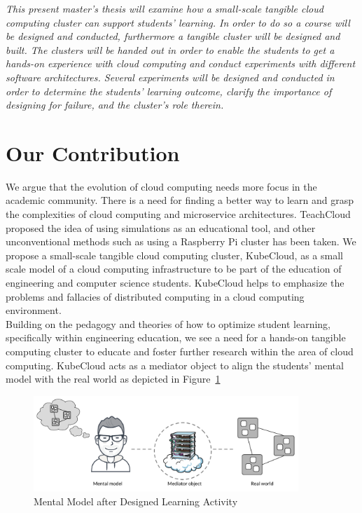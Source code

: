 \noindent\textit{This present master’s thesis will examine how a small-scale tangible cloud computing cluster can support students’ learning. In order to do so a course will be designed and conducted, furthermore a tangible cluster will be designed and built. The clusters will be handed out in order to enable the students to get a hands-on experience with cloud computing and conduct experiments with different software architectures. Several experiments will be designed and conducted in order to determine the students’ learning outcome, clarify the importance of designing for failure, and the cluster’s role therein.}

\section{Our Contribution}


We argue that the evolution of cloud computing needs more focus in the academic community. There is a need for finding a better way to learn and grasp the complexities of cloud computing and microservice architectures. TeachCloud proposed the idea of using simulations as an educational tool, and other unconventional methods such as using a Raspberry Pi cluster has been taken. We propose a small-scale tangible cloud computing cluster, KubeCloud, as a small scale model of a cloud computing infrastructure to be part of the education of engineering and computer science students. KubeCloud helps to emphasize the problems and fallacies of distributed computing in a cloud computing environment. \\

\noindent Building on the pedagogy and theories of how to optimize student learning, specifically within engineering education, we see a need for a hands-on tangible computing cluster to educate and foster further research within the area of cloud computing. KubeCloud acts as a mediator object to align the students' mental model with the real world as depicted  in Figure~\ref{fig:mental_model_future}

\begin{figure}[H]
	\centering
	\includegraphics[width=10cm]{figures/mental_model_future}
	\caption{Mental Model after Designed Learning Activity}
	\label{fig:mental_model_future}
\end{figure}

